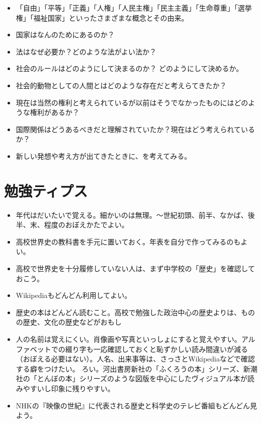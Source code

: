 \documentclass[autodetect-engine,dvipdfmx-if-dvi,ja=standard]{bxjsarticle} \usepackage{mystyle}
\begin{document}
\begin{itemize}
\item 「自由」「平等」「正義」「人権」「人民主権」「民主主義」「生命尊重」「選挙権」「福祉国家」といったさまざまな概念とその由来。
\item 国家はなんのためにあるのか？
  
\item 法はなぜ必要か？どのような法がよい法か？

\item 社会のルールはどのようにして決まるのか？ どのようにして決めるか。

\item 社会的動物としての人間とはどのような存在だと考えらてきたか？

\item 現在は当然の権利と考えられているが以前はそうでなかったものにはどのような権利があるか？

\item 国際関係はどうあるべきだと理解されていたか？現在はどう考えられているか？

\item 新しい発想や考え方が出てきたときに、を考えてみる。

\end{itemize}






\section*{勉強ティプス}

\begin{itemize}

\item 年代はだいたいで覚える。細かいのは無理。〜世紀初頭、前半、なかば、後半、末、程度のおぼえかたでよい。

\item 高校世界史の教科書を手元に置いておく。年表を自分で作ってみるのもよい。
\item 高校で世界史を十分履修していない人は、まず中学校の「歴史」を確認しておこう。
\item Wikipediaもどんどん利用してよい。
\item 歴史の本はどんどん読むこと。高校で勉強した政治中心の歴史よりは、ものの歴史、文化の歴史などがおもし\item 人の名前は覚えにくい。肖像画や写真といっしょにすると覚えやすい。アルファベットでの綴り字も一応確認しておくと恥ずかしい読み間違いが減る（おぼえる必要はない）。人名、出来事等は、さっさとWikipediaなどで確認する癖をつけたい。
ろい。河出書房新社の「ふくろうの本」シリーズ、新潮社の「とんぼの本」シリーズのような図版を中心にしたヴィジュアル本が読みやすいし印象に残りやすい。
\item NHKの『映像の世紀』に代表される歴史と科学史のテレビ番組もどんどん見よう。
\end{itemize}
\end{document}
